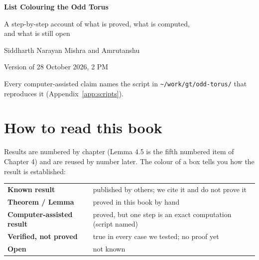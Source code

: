 \documentclass[11pt,oneside,openany]{book}
\newcounter{res}[chapter]
\begin{document}
\begin{titlepage}
\centering\vspace*{2.5cm}
{\color{cac!80!black}\Huge\bfseries List Colouring the Odd Torus\par}
\vspace{0.6cm}
{\Large A step-by-step account of what is proved, what is computed,\\ and what is still open\par}
\vspace{2cm}
{\large Siddharth Narayan Mishra \quad and \quad Amrutanshu\par}
\vspace{0.5cm}
{\large Version of 28 October 2026, 2 PM\par}
\vfill
{\small Every computer-assisted claim names the script in \texttt{\textasciitilde/work/gt/odd-torus/} that
reproduces it (Appendix~\ref{app:scripts}).}
\end{titlepage}

\tableofcontents

\chapter*{How to read this book}

Results are numbered by chapter (Lemma 4.5 is the fifth numbered item of Chapter 4) and are reused by
number later. The colour of a box tells you how the result is established:

\begin{center}
\renewcommand{\arraystretch}{1.3}
\begin{tabular}{ll}
\toprule
\textcolor{citc}{\textbf{Known result}} & published by others; we cite it and do not prove it\\
\textcolor{prc}{\textbf{Theorem / Lemma}} & proved in this book by hand\\
\textcolor{cac}{\textbf{Computer-assisted result}} & proved, but one step is an exact computation (script named)\\
\textcolor{vec}{\textbf{Verified, not proved}} & true in every case we tested; no proof yet\\
\textcolor{opc}{\textbf{Open}} & not known\\
\bottomrule
\end{tabular}
\end{center}
\end{document}
